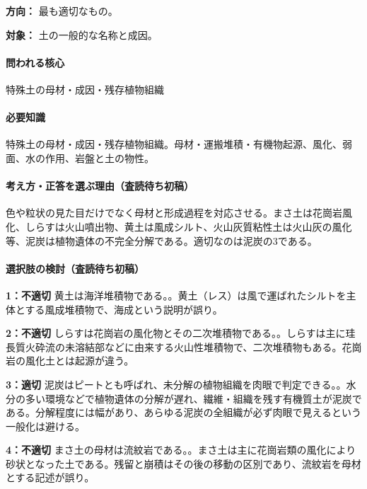 \noindent\textbf{方向：} 最も適切なもの。\par

\noindent\textbf{対象：} 土の一般的な名称と成因。\par

\paragraph{問われる核心} 特殊土の母材・成因・残存植物組織

\paragraph{必要知識} 特殊土の母材・成因・残存植物組織。母材・運搬堆積・有機物起源、風化、弱面、水の作用、岩盤と土の物性。

\paragraph{考え方・正答を選ぶ理由（査読待ち初稿）} 色や粒状の見た目だけでなく母材と形成過程を対応させる。まさ土は花崗岩風化、しらすは火山噴出物、黄土は風成シルト、火山灰質粘性土は火山灰の風化等、泥炭は植物遺体の不完全分解である。適切なのは泥炭の3である。

\paragraph{選択肢の検討（査読待ち初稿）}\mbox{}\par

\noindent\textbf{1：不適切} 黄土は海洋堆積物である。。黄土（レス）は風で運ばれたシルトを主体とする風成堆積物で、海成という説明が誤り。\par

\noindent\textbf{2：不適切} しらすは花崗岩の風化物とその二次堆積物である。。しらすは主に珪長質火砕流の未溶結部などに由来する火山性堆積物で、二次堆積物もある。花崗岩の風化土とは起源が違う。\par

\noindent\textbf{3：適切} 泥炭はピートとも呼ばれ、未分解の植物組織を肉眼で判定できる。。水分の多い環境などで植物遺体の分解が遅れ、繊維・組織を残す有機質土が泥炭である。分解程度には幅があり、あらゆる泥炭の全組織が必ず肉眼で見えるという一般化は避ける。\par

\noindent\textbf{4：不適切} まさ土の母材は流紋岩である。。まさ土は主に花崗岩類の風化により砂状となった土である。残留と崩積はその後の移動の区別であり、流紋岩を母材とする記述が誤り。\par

